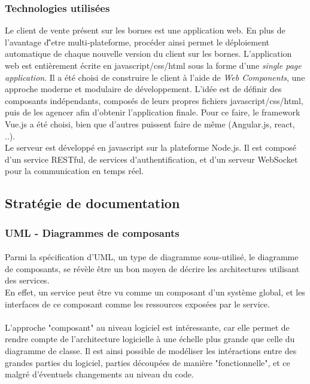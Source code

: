    \subsubsection{Technologies utilisées}
        Le client de vente présent sur les bornes est une application web. En plus de l'avantage d'̂etre
        multi-plateforme, procéder ainsi permet le déploiement automatique de chaque nouvelle version
        du client sur les bornes. L'application web est entièrement écrite en javascript/css/html
        sous la forme d'une \textit{single page application}. Il a été choisi de construire le
        client à l'aide de \textit{Web Components}, une approche moderne et modulaire de développement.
        L'idée est de définir des composants indépendants, composés de leurs propres fichiers javascript/css/html,
        puis de les agencer afin d'obtenir l'application finale. Pour ce faire, le framework Vue.js
        a été choisi, bien que d'autres puissent faire de même (Angular.js, react, ..).\\
        Le serveur est développé en javascript sur la plateforme Node.js. Il est composé d'un service
        RESTful, de services d'authentification, et d'un serveur WebSocket pour la communication en
        temps réel.

\newpage
\subsection{Stratégie de documentation}
    \subsubsection{UML - Diagrammes de composants}
        \paragraph{}
            Parmi la spécification d'UML, un type de diagramme sous-utilisé, le diagramme de composants,
            se révèle être un bon moyen de décrire les architectures utilisant des services.\\
            En effet, un service peut être vu comme un composant d'un système global, et les interfaces
            de ce composant comme les ressources exposées par le service.

        \paragraph{}
            L'approche "composant" au niveau logiciel est intéressante, car elle permet de rendre compte
            de l'architecture logicielle à une échelle plus grande que celle du diagramme de classe.
            Il est ainsi possible de modéliser les intéractions entre des grandes parties du logiciel,
            parties découpées de manière "fonctionnelle", et ce malgré d'éventuels changements au niveau
            du code.


